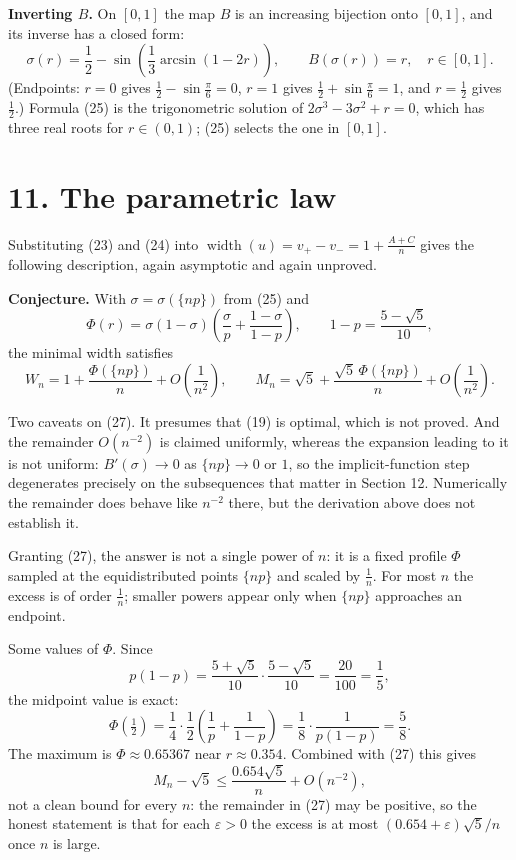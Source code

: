 \documentclass[12pt]{article}
\newcommand{\W}{\operatorname{width}}
\begin{document}
\textbf{Inverting \(B\).} On \([0,1]\) the map \(B\) is an increasing
bijection onto \([0,1]\), and its inverse has a closed form:
\[
\boxed{\displaystyle
\sigma(r)=\frac12-\sin\!\left(\frac13\arcsin(1-2r)\right),
\qquad
B(\sigma(r))=r,\quad r\in[0,1].}
\tag{25}
\]
(Endpoints: \(r=0\) gives \(\frac12-\sin\frac\pi6=0\), \(r=1\) gives
\(\frac12+\sin\frac\pi6=1\), and \(r=\frac12\) gives \(\frac12\).)
Formula (25) is the trigonometric solution of \(2\sigma^3-3\sigma^2+r=0\),
which has three real roots for \(r\in(0,1)\); (25) selects the one in
\([0,1]\).

\section*{11. The parametric law}

Substituting (23) and (24) into \(\W(u)=v_+-v_-=1+\frac{A+C}{n}\) gives
the following description, again asymptotic and again unproved.

\textbf{Conjecture.} With \(\sigma=\sigma(\{np\})\) from (25) and
\[
\boxed{\displaystyle
\Phi(r)=\sigma(1-\sigma)\left(\frac{\sigma}{p}+\frac{1-\sigma}{1-p}\right),
\qquad 1-p=\frac{5-\sqrt5}{10},}
\tag{26}
\]
the minimal width satisfies
\[
\boxed{\displaystyle
W_n=1+\frac{\Phi(\{np\})}{n}+O\!\left(\frac1{n^{2}}\right),
\qquad
M_n=\sqrt5+\frac{\sqrt5\,\Phi(\{np\})}{n}+O\!\left(\frac1{n^{2}}\right).}
\tag{27}
\]

Two caveats on (27). It presumes that (19) is optimal, which is not
proved. And the remainder \(O(n^{-2})\) is claimed uniformly, whereas the
expansion leading to it is not uniform: \(B'(\sigma)\to0\) as
\(\{np\}\to0\) or \(1\), so the implicit-function step degenerates
precisely on the subsequences that matter in Section 12. Numerically the
remainder does behave like \(n^{-2}\) there, but the derivation above
does not establish it.

Granting (27), the answer is not a single power of \(n\): it is a fixed
profile \(\Phi\) sampled at the equidistributed points \(\{np\}\) and
scaled by \(\frac1n\). For most \(n\) the excess is of order \(\frac1n\);
smaller powers appear only when \(\{np\}\) approaches an endpoint.

Some values of \(\Phi\). Since
\[
p(1-p)=\frac{5+\sqrt5}{10}\cdot\frac{5-\sqrt5}{10}=\frac{20}{100}=\frac15,
\]
the midpoint value is exact:
\[
\Phi\!\left(\tfrac12\right)
=\frac14\cdot\frac12\left(\frac1p+\frac1{1-p}\right)
=\frac18\cdot\frac{1}{p(1-p)}
=\frac58 .
\]
The maximum is \(\Phi\approx0.65367\) near \(r\approx0.354\). Combined
with (27) this gives
\[
M_n-\sqrt5\le\frac{0.654\sqrt5}{n}+O(n^{-2}),
\]
not a clean bound for every \(n\): the remainder in (27) may be positive,
so the honest statement is that for each \(\varepsilon>0\) the excess is
at most \((0.654+\varepsilon)\sqrt5/n\) once \(n\) is large.
\end{document}
